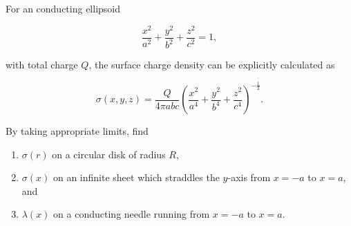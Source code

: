 \documentclass[english,a4paper,12pt]{report}
\begin{document}
{For an conducting ellipsoid
		
\begin{equation}
    \frac{x^2}{a^2} + \frac{y^2}{b^2} + \frac{z^2}{c^2} =1, 
\end{equation}

with total charge \(Q\), the surface charge density can be explicitly calculated as 

\begin{equation}
    \sigma(x,y,z) = \frac{Q}{4\pi abc} \left(\frac{x^2}{a^4} + \frac{y^2}{b^4} + \frac{z^2}{c^4} \right)^{-\frac{1}{2} }. 
\end{equation}

By taking appropriate limits, find  

\begin{enumerate}
    \item \(\sigma (r)\) on a circular disk of radius \(R\),
    \item \(\sigma (x)\) on an infinite sheet which straddles the \(y\)-axis from \(x = -a \) to \(x = a\), and
    \item \(\lambda (x)\) on a conducting needle running from \(x = -a \) to \(x = a\).
\end{enumerate}~}
\end{document}

